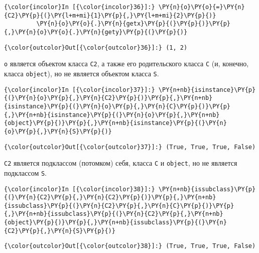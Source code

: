     \begin{Verbatim}[commandchars=\\\{\}]
{\color{incolor}In [{\color{incolor}36}]:} \PY{n}{o}\PY{o}{=}\PY{n}{C2}\PY{p}{(}\PY{l+m+mi}{1}\PY{p}{,}\PY{l+m+mi}{2}\PY{p}{)}
         \PY{n}{o}\PY{o}{.}\PY{n}{getx}\PY{p}{(}\PY{p}{)}\PY{p}{,}\PY{n}{o}\PY{o}{.}\PY{n}{gety}\PY{p}{(}\PY{p}{)}
\end{Verbatim}

            \begin{Verbatim}[commandchars=\\\{\}]
{\color{outcolor}Out[{\color{outcolor}36}]:} (1, 2)
\end{Verbatim}
        
    \texttt{o} является объектом класса \texttt{C2}, а также его
родительского класса \texttt{C} (и, конечно, класса \texttt{object}), но
не является объектом класса \texttt{S}.

    \begin{Verbatim}[commandchars=\\\{\}]
{\color{incolor}In [{\color{incolor}37}]:} \PY{n+nb}{isinstance}\PY{p}{(}\PY{n}{o}\PY{p}{,}\PY{n}{C2}\PY{p}{)}\PY{p}{,}\PY{n+nb}{isinstance}\PY{p}{(}\PY{n}{o}\PY{p}{,}\PY{n}{C}\PY{p}{)}\PY{p}{,}\PY{n+nb}{isinstance}\PY{p}{(}\PY{n}{o}\PY{p}{,}\PY{n+nb}{object}\PY{p}{)}\PY{p}{,}\PY{n+nb}{isinstance}\PY{p}{(}\PY{n}{o}\PY{p}{,}\PY{n}{S}\PY{p}{)}
\end{Verbatim}

            \begin{Verbatim}[commandchars=\\\{\}]
{\color{outcolor}Out[{\color{outcolor}37}]:} (True, True, True, False)
\end{Verbatim}
        
    \texttt{C2} является подклассом (потомком) себя, класса \texttt{C} и
\texttt{object}, но не является подклассом \texttt{S}.

    \begin{Verbatim}[commandchars=\\\{\}]
{\color{incolor}In [{\color{incolor}38}]:} \PY{n+nb}{issubclass}\PY{p}{(}\PY{n}{C2}\PY{p}{,}\PY{n}{C2}\PY{p}{)}\PY{p}{,}\PY{n+nb}{issubclass}\PY{p}{(}\PY{n}{C2}\PY{p}{,}\PY{n}{C}\PY{p}{)}\PY{p}{,}\PY{n+nb}{issubclass}\PY{p}{(}\PY{n}{C2}\PY{p}{,}\PY{n+nb}{object}\PY{p}{)}\PY{p}{,}\PY{n+nb}{issubclass}\PY{p}{(}\PY{n}{C2}\PY{p}{,}\PY{n}{S}\PY{p}{)}
\end{Verbatim}

            \begin{Verbatim}[commandchars=\\\{\}]
{\color{outcolor}Out[{\color{outcolor}38}]:} (True, True, True, False)
\end{Verbatim}
        
